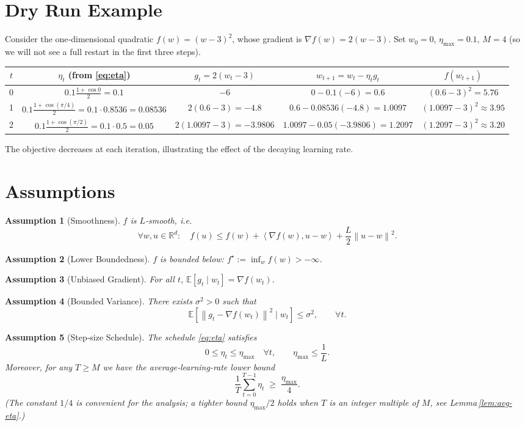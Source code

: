 \documentclass{article}
\newtheorem{assumption}{Assumption}
\newcommand{\EE}{\mathbb{E}}
\newcommand{\RR}{\mathbb{R}}
\newcommand{\norm}[1]{\left\|#1\right\|}
\newcommand{\inner}[2]{\left\langle #1,#2\right\rangle}
\begin{document}
\section*{Dry Run Example}
Consider the one‑dimensional quadratic $f(w)=(w-3)^2$, whose gradient is $\nabla f(w)=2(w-3)$.  
Set $w_0=0$, $\eta_{\max}=0.1$, $M=4$ (so we will not see a full restart in the first three steps).

\begin{center}
\begin{tabular}{c|c|c|c|c}
$t$ & $\eta_t$ (from \eqref{eq:eta}) & $g_t=2(w_t-3)$ & $w_{t+1}=w_t-\eta_t g_t$ & $f(w_{t+1})$ \\ \hline
0 & $0.1\frac{1+\cos0}{2}=0.1$ & $-6$ & $0-0.1(-6)=0.6$ & $(0.6-3)^2=5.76$\\
1 & $0.1\frac{1+\cos(\pi/4)}{2}=0.1\cdot0.8536=0.08536$ & $2(0.6-3)=-4.8$ & $0.6-0.08536(-4.8)=1.0097$ & $(1.0097-3)^2\approx3.95$\\
2 & $0.1\frac{1+\cos(\pi/2)}{2}=0.1\cdot0.5=0.05$ & $2(1.0097-3)=-3.9806$ & $1.0097-0.05(-3.9806)=1.2097$ & $(1.2097-3)^2\approx3.20$\\
\end{tabular}
\end{center}
The objective decreases at each iteration, illustrating the effect of the decaying learning rate.

\newpage
\section*{Assumptions}
\begin{assumption}[Smoothness]\label{ass:smooth}
$f$ is $L$‑smooth, i.e.
\[
\forall w,u\in\RR^{d}:\quad 
f(u)\le f(w)+\inner{\nabla f(w)}{u-w}+\frac{L}{2}\norm{u-w}^{2}.
\]
\end{assumption}
\begin{assumption}[Lower Boundedness]\label{ass:lb}
$f$ is bounded below: $f^{\star}:=\inf_{w}f(w)>-\infty$.
\end{assumption}
\begin{assumption}[Unbiased Gradient]\label{ass:unbiased}
For all $t$, $\EE\!\left[g_t\mid w_t\right]=\nabla f(w_t)$.
\end{assumption}
\begin{assumption}[Bounded Variance]\label{ass:variance}
There exists $\sigma^{2}>0$ such that
\[
\EE\!\left[\norm{g_t-\nabla f(w_t)}^{2}\mid w_t\right]\le\sigma^{2},\qquad\forall t.
\]
\end{assumption}
\begin{assumption}[Step‑size Schedule]\label{ass:eta}
The schedule \eqref{eq:eta} satisfies
\[
0\le\eta_t\le\eta_{\max}\quad\forall t,
\qquad
\eta_{\max}\le\frac{1}{L}.
\tag{A5}
\]
Moreover, for any $T\ge M$ we have the average‑learning‑rate lower bound
\[
\frac{1}{T}\sum_{t=0}^{T-1}\eta_t\;\ge\;\frac{\eta_{\max}}{4}.
\tag{A6}
\]
(The constant $1/4$ is convenient for the analysis; a tighter bound $\eta_{\max}/2$ holds when $T$ is an integer multiple of $M$, see Lemma \ref{lem:avg-eta}.) 
\end{assumption}
\end{document}
